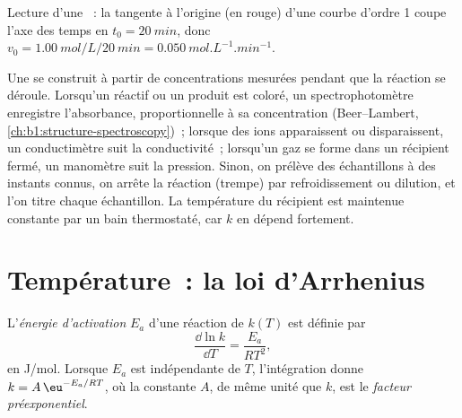 \begin{omfigure}

{\small Lecture d'une ~: la tangente à l'origine (en
rouge) d'une courbe d'ordre 1 coupe l'axe des temps en
$t_0 = \qty{20}{min}$, donc $v_0 =
\qty{1.00}{mol/L}/\qty{20}{min} = \qty{0.050}{mol.L^{-1}.min^{-1}}$.}
\end{omfigure}

\begin{inthelab}
Une  se construit à partir de concentrations mesurées
pendant que la réaction se déroule. Lorsqu'un réactif ou un produit est
coloré, un spectrophotomètre enregistre l'absorbance, proportionnelle à
sa concentration (Beer--Lambert, \cref{ch:b1:structure-spectroscopy})~;
lorsque des ions apparaissent ou disparaissent, un conductimètre suit la
conductivité~; lorsqu'un gaz se forme dans un récipient fermé, un
manomètre suit la pression. Sinon, on prélève des échantillons à des
instants connus, on arrête la réaction (trempe) par refroidissement ou
dilution, et l'on titre chaque échantillon. La température du récipient
est maintenue constante par un bain thermostaté, car $k$ en dépend
fortement.
\end{inthelab}

\section{Température~: la loi d'Arrhenius}

\begin{definition}\label{def:b1:rate-laws:activation-energy}
L'\emph{énergie d'activation} $E_a$ d'une réaction de
 $k(T)$ est définie par
\[
  \frac{\dd \ln k}{\dd T} = \frac{E_a}{RT^2} ,
\]
en \unit{J/mol}. Lorsque $E_a$ est indépendante de $T$, l'intégration
donne $k = A\,\eu^{-E_a/RT}$, où la constante $A$, de même unité que
$k$, est le \emph{facteur préexponentiel}.
\end{definition}

